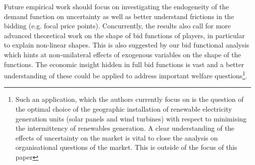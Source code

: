 Future empirical work should focus on investigating the endogeneity of the demand function on uncertainty as well as better understand frictions in the bidding (e.g. focal price points). Concurrently, the results also call for more advanced theoretical work on the shape of bid functions of players, in particular to explain non-linear shapes. This is also suggested by our bid functional analysis which hints at non-unilateral effects of exogenous variables on the shape of the functions. The economic insight hidden in full bid functions is vast and a better understanding of these could be applied to address important welfare questions\footnote{Such an application, which the authors currently focus on is the question of the optimal choice of the geographic installation of renewable electricity generation units (solar panels and wind turbines) with respect to minimising the intermittency of renewables generation. A clear understanding of the effects of uncertainty on the market is vital to close the analysis on organisational questions of the market. This is outside of the focus of this paper}.\\

